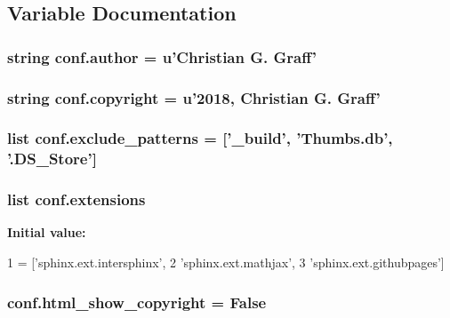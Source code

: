 \subsection{Variable Documentation}
\hypertarget{namespaceconf_a637c239d256432248aa8d9f3ab0b8c52}{
\subsubsection[{author}]{\setlength{\rightskip}{0pt plus 5cm}string conf.\-author = u'Christian G. Graff'}}\label{namespaceconf_a637c239d256432248aa8d9f3ab0b8c52}
\hypertarget{namespaceconf_a33fa97cf51dcb25970fbf53f10159589}{
\subsubsection[{copyright}]{\setlength{\rightskip}{0pt plus 5cm}string conf.\-copyright = u'2018, Christian G. Graff'}}\label{namespaceconf_a33fa97cf51dcb25970fbf53f10159589}
\hypertarget{namespaceconf_a7ad48fb6f3e9b129c02346ea0d3527c1}{
\subsubsection[{exclude\-\_\-patterns}]{\setlength{\rightskip}{0pt plus 5cm}list conf.\-exclude\-\_\-patterns = \mbox{[}'\-\_\-build', 'Thumbs.\-db', '.D\-S\-\_\-\-Store'\mbox{]}}}\label{namespaceconf_a7ad48fb6f3e9b129c02346ea0d3527c1}
\hypertarget{namespaceconf_ae475e080536acb271a0a0efe56c3ba42}{
\subsubsection[{extensions}]{\setlength{\rightskip}{0pt plus 5cm}list conf.\-extensions}}\label{namespaceconf_ae475e080536acb271a0a0efe56c3ba42}
{\bfseries Initial value\-:}
\begin{DoxyCode}
1 = [\textcolor{stringliteral}{'sphinx.ext.intersphinx'},
2     \textcolor{stringliteral}{'sphinx.ext.mathjax'},
3     \textcolor{stringliteral}{'sphinx.ext.githubpages'}]
\end{DoxyCode}
\hypertarget{namespaceconf_aef058dc18c5e6a45d2cebad007a465c7}{
\subsubsection[{html\-\_\-show\-\_\-copyright}]{\setlength{\rightskip}{0pt plus 5cm}conf.\-html\-\_\-show\-\_\-copyright = False}}\label{namespaceconf_aef058dc18c5e6a45d2cebad007a465c7}
